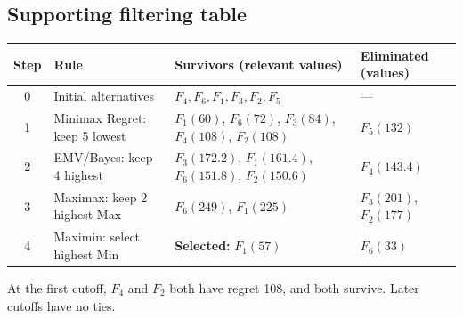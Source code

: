 \subsection*{Supporting filtering table}
\begin{center}\small
\begin{tabularx}{\textwidth}{@{}c >{\raggedright\arraybackslash}p{} >{\raggedright\arraybackslash}X >{\raggedright\arraybackslash}p{}@{}}
\toprule
Step & Rule & Survivors (relevant values) & Eliminated (values)\\\midrule
0 & Initial alternatives & $F_4,F_6,F_1,F_3,F_2,F_5$ & ---\\
1 & Minimax Regret: keep 5 lowest & $F_1(60)$, $F_6(72)$, $F_3(84)$, $F_4(108)$, $F_2(108)$ & $F_5(132)$\\
2 & EMV/Bayes: keep 4 highest & $F_3(172.2)$, $F_1(161.4)$, $F_6(151.8)$, $F_2(150.6)$ & $F_4(143.4)$\\
3 & Maximax: keep 2 highest Max & $F_6(249)$, $F_1(225)$ & $F_3(201)$, $F_2(177)$\\
4 & Maximin: select highest Min & \textbf{Selected:} $F_1(57)$ & $F_6(33)$\\
\bottomrule\end{tabularx}
\end{center}
At the first cutoff, $F_4$ and $F_2$ both have regret 108, and both survive. Later cutoffs have no ties.
\secInicio[sec:q4]

\label{sol:q4tree}
